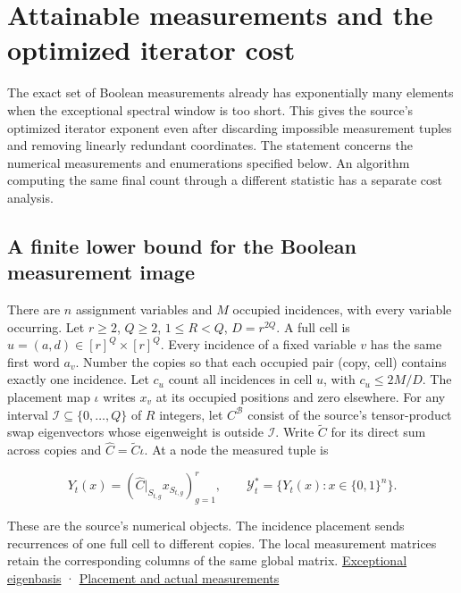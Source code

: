 \documentclass[
  11pt,
]{article}
\begin{document}
\section{Attainable measurements and the optimized iterator
cost}\label{attainable-measurements-and-the-optimized-iterator-cost}

The exact set of Boolean measurements already has exponentially many
elements when the exceptional spectral window is too short. This gives
the source's optimized iterator exponent even after discarding
impossible measurement tuples and removing linearly redundant
coordinates. The statement concerns the numerical measurements and
enumerations specified below. An algorithm computing the same final
count through a different statistic has a separate cost analysis.

\subsection{A finite lower bound for the Boolean measurement
image}\label{a-finite-lower-bound-for-the-boolean-measurement-image}

There are \(n\) assignment variables and \(M\) occupied incidences, with
every variable occurring. Let \(r\ge2\), \(Q\ge2\), \(1\le R<Q\),
\(D=r^{2Q}\). A full cell is \(u=(a,d)\in[r]^Q\times[r]^Q\). Every
incidence of a fixed variable \(v\) has the same first word \(a_v\).
Number the copies so that each occupied pair (copy, cell) contains
exactly one incidence. Let \(c_u\) count all incidences in cell \(u\),
with \(c_u\le 2M/D\). The placement map \(\iota\) writes \(x_v\) at its
occupied positions and zero elsewhere. For any interval
\(\mathcal I\subseteq\{0,\ldots,Q\}\) of \(R\) integers, let
\(C^{\mathcal B}\) consist of the source's tensor-product swap
eigenvectors whose eigenweight is outside \(\mathcal I\). Write
\(\widetilde C\) for its direct sum across copies and
\(\widehat C=\widetilde C\iota\). At a node the measured tuple is

\[
 Y_t(x)=(\widehat C|_{S_{t,g}}x_{S_{t,g}})_{g=1}^r,\qquad
 \mathcal Y_t^*=\{Y_t(x):x\in\{0,1\}^n\}.
\]

These are the source's numerical objects. The incidence placement sends
recurrences of one full cell to different copies. The local measurement
matrices retain the corresponding columns of the same global matrix.
\href{https://github.com/openai/math/blob/main/preprints/The-Exponential-Time-Hypothesis-is-False-October-25-2026/build/main_full_version.tex\#L2240-L2276}{Exceptional
eigenbasis} ·
\href{https://github.com/openai/math/blob/main/preprints/The-Exponential-Time-Hypothesis-is-False-October-25-2026/build/main_full_version.tex\#L2532-L2598}{Placement
and actual measurements}
\end{document}
